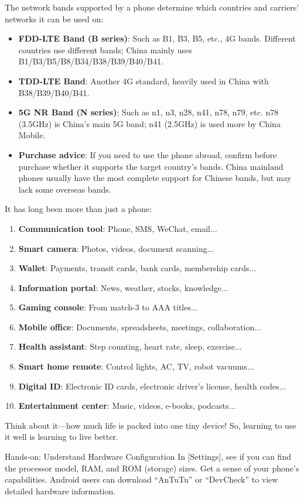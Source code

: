 The network bands supported by a phone determine which countries and carriers' networks it can be used on:

\begin{itemize}
  \item \textbf{FDD-LTE Band (B series)}: Such as B1, B3, B5, etc., 4G bands. Different countries use different bands; China mainly uses B1/B3/B5/B8/B34/B38/B39/B40/B41.
  \item \textbf{TDD-LTE Band}: Another 4G standard, heavily used in China with B38/B39/B40/B41.
  \item \textbf{5G NR Band (N series)}: Such as n1, n3, n28, n41, n78, n79, etc. n78 (3.5GHz) is China's main 5G band; n41 (2.5GHz) is used more by China Mobile.
  \item \textbf{Purchase advice}: If you need to use the phone abroad, confirm before purchase whether it supports the target country's bands. China mainland phones usually have the most complete support for Chinese bands, but may lack some overseas bands.
\end{itemize}


It has long been more than just a phone:

\begin{enumerate}
  \item \textbf{Communication tool}: Phone, SMS, WeChat, email...
  \item \textbf{Smart camera}: Photos, videos, document scanning...
  \item \textbf{Wallet}: Payments, transit cards, bank cards, membership cards...
  \item \textbf{Information portal}: News, weather, stocks, knowledge...
  \item \textbf{Gaming console}: From match-3 to AAA titles...
  \item \textbf{Mobile office}: Documents, spreadsheets, meetings, collaboration...
  \item \textbf{Health assistant}: Step counting, heart rate, sleep, exercise...
  \item \textbf{Smart home remote}: Control lights, AC, TV, robot vacuums...
  \item \textbf{Digital ID}: Electronic ID cards, electronic driver's license, health codes...
  \item \textbf{Entertainment center}: Music, videos, e-books, podcasts...
\end{enumerate}

Think about it—how much life is packed into one tiny device! So, learning to use it well is learning to live better.

\begin{tcbpractice}{Hands-on: Understand Hardware Configuration}
In [Settings], see if you can find the processor model, RAM, and ROM (storage) sizes. Get a sense of your phone's capabilities. Android users can download “AnTuTu” or “DevCheck” to view detailed hardware information.

\end{tcbpractice}
